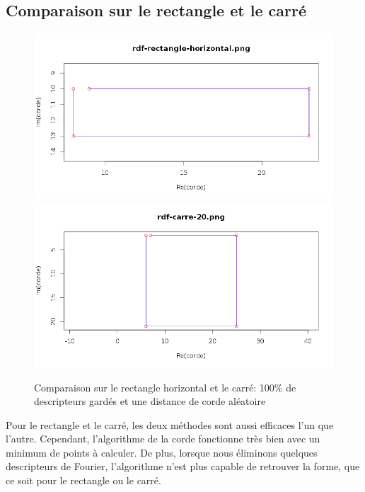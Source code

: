 \documentclass[11pt]{article}
\begin{document}
    \subsection{Comparaison sur le rectangle et le carré}
    \begin{figure}[!h]
      \begin{center}
	\includegraphics[width=13cm]{../resultat/comp_rect.png}\\
	\includegraphics[width=13cm]{../resultat/comp_carre.png}
      \end{center}
      \caption{Comparaison sur le rectangle horizontal et le carré: 100\% de descripteurs gardés et une distance de corde aléatoire}
    \end{figure}
  
  \newpage
  
  Pour le rectangle et le carré, les deux méthodes sont aussi efficaces l'un que l'autre. Cependant, l'algorithme de la corde
  fonctionne très bien avec un minimum de points à calculer.
  De plus, lorsque nous éliminons quelques descripteurs de Fourier, l'algorithme n'est plus capable de
  retrouver la forme, que ce soit pour le rectangle ou le carré.\\
  
\end{document}
